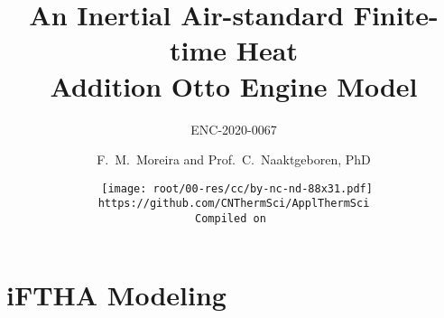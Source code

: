 \makeatletter
\immediate{} %
\makeatother



\newcommand{\VPMS}{{\ensuremath V_{\mathrm{PMS}}}}
\newcommand{\VPMI}{{\ensuremath V_{\mathrm{PMI}}}}
\title{An Inertial Air-standard Finite-time Heat\\ Addition Otto Engine Model}
\subtitle{ENC-2020-0067}
\author{F.~M.~Moreira and Prof.~C.~Naaktgeboren, PhD}
\date{{\scriptsize\tt%
    \texttt{[image: root/00-res/cc/by-nc-nd-88x31.pdf]}\\[\smallskipamount]
    https://github.com/CNThermSci/ApplThermSci\\
    Compiled on 
}}

\frame{\titlepage}
\frame{\tableofcontents}

\section{iFTHA Modeling}


